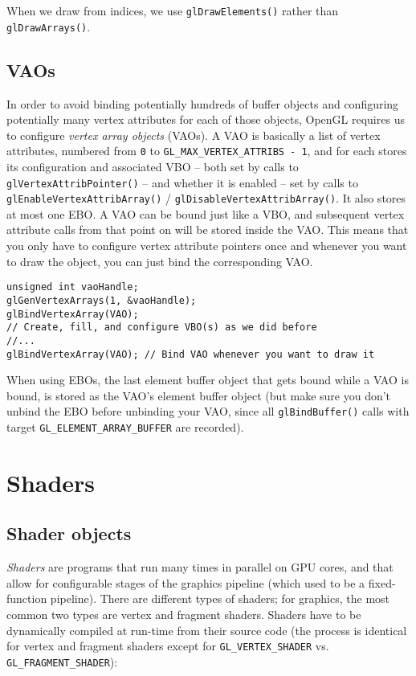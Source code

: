 \documentclass[8pt, table, xcdraw]{article}%
\begin{document}
When we draw from indices, we use \lstinline{glDrawElements()} rather than \lstinline{glDrawArrays()}.

\subsection{VAOs} \label{vaos}

In order to avoid binding potentially hundreds of buffer objects and configuring potentially many vertex attributes for each of those objects, OpenGL requires us to configure \emph{vertex array objects} (VAOs). A VAO is basically a list of vertex attributes, numbered from \lstinline{0} to \lstinline{GL_MAX_VERTEX_ATTRIBS - 1}, and for each stores its configuration and associated VBO -- both set by calls to \lstinline{glVertexAttribPointer()} -- and whether it is enabled -- set by calls to \lstinline{glEnableVertexAttribArray()} / \lstinline{glDisableVertexAttribArray()}. It also stores at most one EBO. A VAO can be bound just like a VBO, and subsequent vertex attribute calls from that point on will be stored inside the VAO. This means that you only have to configure vertex attribute pointers once and whenever you want to draw the object, you can just bind the corresponding VAO.

\begin{lstlisting}
unsigned int vaoHandle;
glGenVertexArrays(1, &vaoHandle);
glBindVertexArray(VAO);
// Create, fill, and configure VBO(s) as we did before
//...
glBindVertexArray(VAO); // Bind VAO whenever you want to draw it
\end{lstlisting}

When using EBOs, the last element buffer object that gets bound while a VAO is bound, is stored as the VAO's element buffer object (but make sure you don't unbind the EBO before unbinding your VAO, since all \lstinline{glBindBuffer()} calls with target \lstinline{GL_ELEMENT_ARRAY_BUFFER} are recorded).

\section{Shaders}

\subsection{Shader objects}

\emph{Shaders} are programs that run many times in parallel on GPU cores, and that allow for configurable stages of the graphics pipeline (which used to be a fixed-function pipeline). There are different types of shaders; for graphics, the most common two types are vertex and fragment shaders. Shaders have to be dynamically compiled at run-time from their source code (the process is identical for vertex and fragment shaders except for \lstinline{GL_VERTEX_SHADER} vs. \lstinline{GL_FRAGMENT_SHADER}):
\end{document}

